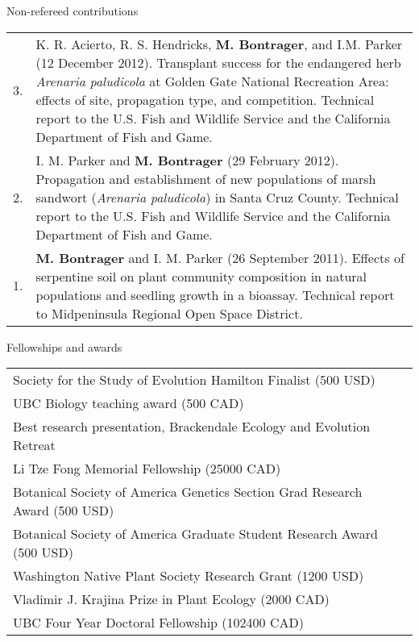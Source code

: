 \documentclass[letterpaper,11pt,oneside]{article}
\begin{document}
\bigskip
\bigskip


\bgroup
\noindent\Large{Non-refereed contributions}  
\normalsize
\bigskip

\def\arraystretch{1.2}
\noindent \begin{tabular}{@{} p{1cm} >{\raggedright\arraybackslash}p{15.11cm}}
3. & K. R. Acierto, R. S. Hendricks, \textbf{M. Bontrager}, and I.M. Parker (12 December 2012). Transplant success for the endangered herb \textit{Arenaria paludicola} at Golden Gate National Recreation Area: effects of site, propagation type, and competition. Technical report to the U.S. Fish and Wildlife Service and the California Department of Fish and Game. \\
2. & I. M. Parker and \textbf{M. Bontrager} (29 February 2012). Propagation and establishment of new populations of marsh sandwort (\textit{Arenaria paludicola}) in Santa Cruz County. Technical report to the U.S. Fish and Wildlife Service and the California Department of Fish and Game. \\
1. & \textbf{M. Bontrager} and I. M. Parker (26 September 2011). Effects of serpentine soil on plant community composition in natural populations and seedling growth in a bioassay. Technical report to Midpeninsula Regional Open Space District. \\
\end{tabular}
\egroup
\bigskip
\bigskip

\newpage




\bgroup
\noindent\Large{Fellowships and awards}
\bigskip

\normalsize
\noindent \begin{tabular}{@{} >{\raggedright\arraybackslash}p{14.91cm} >{\raggedleft\arraybackslash}p{1.2cm}}
Society for the Study of Evolution Hamilton Finalist (500 USD) & 2019 \\ 
UBC Biology teaching award (500 CAD) & 2018 \\
Best research presentation, Brackendale Ecology and Evolution Retreat & 2016 \\
Li Tze Fong Memorial Fellowship (25000 CAD) & 2016 \\
Botanical Society of America Genetics Section Grad Research Award (500 USD) & 2016 \\
Botanical Society of America Graduate Student Research Award (500 USD) & 2016 \\
Washington Native Plant Society Research Grant (1200 USD) & 2016 \\
Vladimir J. Krajina Prize in Plant Ecology (2000 CAD) & 2013 \\
UBC Four Year Doctoral Fellowship (102400 CAD) & 2012 \\
\end{tabular}
\egroup
\bigskip
\bigskip
 
\end{document}
